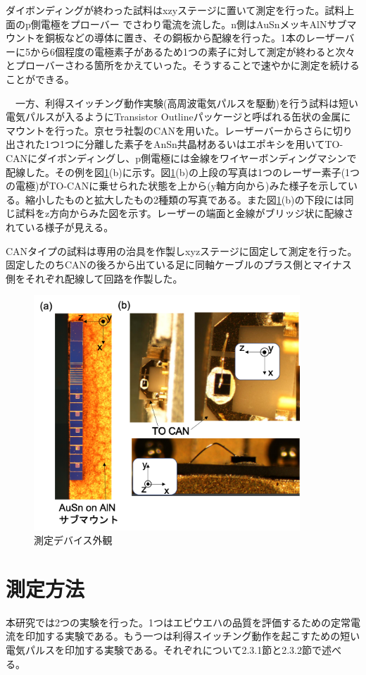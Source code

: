 ダイボンディングが終わった試料はxzyステージに置いて測定を行った。試料上面のp側電極をプローバー
でさわり電流を流した。n側はAuSnメッキAlNサブマウントを銅板などの導体に置き、その銅板から配線を行った。1本のレーザーバーに5から6個程度の電極素子があるため1つの素子に対して測定が終わると次々とプローバーさわる箇所をかえていった。そうすることで速やかに測定を続けることができる。


　一方、利得スイッチング動作実験(高周波電気パルスを駆動)を行う試料は短い電気パルスが入るようにTransistor Outlineパッケージと呼ばれる缶状の金属にマウントを行った。京セラ社製のCANを用いた。レーザーバーからさらに切り出された1つ1つに分離した素子をAnSn共晶材あるいはエポキシを用いてTO-CANにダイボンディングし、p側電極には金線をワイヤーボンディングマシンで配線した。その例を図\ref{fig:fig_2_1_mount}(b)に示す。図\ref{fig:fig_2_1_mount}(b)の上段の写真は1つのレーザー素子(1つの電極)がTO-CANに乗せられた状態を上から(y軸方向から)みた様子を示している。縮小したものと拡大したもの2種類の写真である。また図\ref{fig:fig_2_1_mount}(b)の下段には同じ試料をz方向からみた図を示す。レーザーの端面と金線がブリッジ状に配線されている様子が見える。

CANタイプの試料は専用の治具を作製しxyzステージに固定して測定を行った。固定したのちCANの後ろから出ている足に同軸ケーブルのプラス側とマイナス側をそれぞれ配線して回路を作製した。

\begin{figure}[h]%
	\centering
	\includegraphics[width=10cm]{figure/fig_2_1_mount.png}
	\caption{測定デバイス外観}
	\label{fig:fig_2_1_mount}
\end{figure}

\clearpage
\section{測定方法}%
本研究では2つの実験を行った。1つはエピウエハの品質を評価するための定常電流を印加する実験である。もう一つは利得スイッチング動作を起こすための短い電気パルスを印加する実験である。それぞれについて2.3.1節と2.3.2節で述べる。
